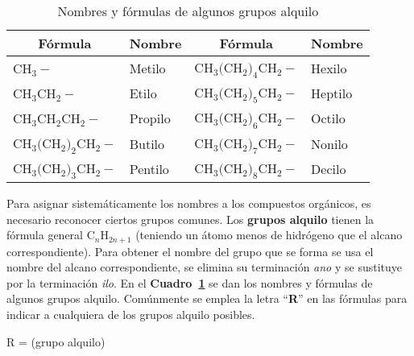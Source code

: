 \begin{table}[hbt]
\caption[Grupos alquilo]{Nombres y f\'ormulas de algunos grupos alquilo}
\label{a-nom}
\begin{center}
\begin{tabular}{ll l l}\hline
\multicolumn{1}{c}{\textbf{F\'ormula}}&\multicolumn{1}{c}{\textbf{Nombre}}&
 \multicolumn{1}{c}{\textbf{F\'ormula}}&\multicolumn{1}{c}{\textbf{Nombre}}\\ \hline
CH$_3-$                & Metilo  &CH$_3($CH$_2)_4$CH$_2-$ & Hexilo \\
CH$_3$CH$_2-$          & Etilo   &CH$_3($CH$_2)_5$CH$_2-$ & Heptilo \\
CH$_3$CH$_2$CH$_2-$    & Propilo &CH$_3($CH$_2)_6$CH$_2-$ & Octilo \\
CH$_3($CH$_2)_2$CH$_2-$& Butilo  &CH$_3($CH$_2)_7$CH$_2-$ & Nonilo \\
CH$_3($CH$_2)_3$CH$_2-$& Pentilo &CH$_3($CH$_2)_8$CH$_2-$ & Decilo \\\hline
\end{tabular}
\end{center}
\end{table}
Para asignar sistem\'aticamente los nombres a los compuestos org\'anicos, es necesario  reconocer ciertos grupos  comunes. Los \textbf{grupos alquilo}  tienen la f\'ormula general C$_n$H$_{2n+1}$ (teniendo un \'atomo menos de hi\-dr\'o\-ge\-no que el alcano correspondiente). Para obtener el nombre del grupo que se forma se usa el nombre del alcano correspondiente, se elimina su
terminaci\'on \textit{ano} y se sustituye por la terminaci\'on \textit{ilo}. En el \textbf{Cuadro~\ref{a-nom}} se dan  los nombres y f\'ormulas de algunos grupos alquilo. Com\'unmente se emplea la letra ``\textbf{R}'' en las f\'ormulas para indicar a cualquiera de los grupos alquilo posibles.

\hskip1.5in R =  \hspace{.2in} (grupo alquilo)

